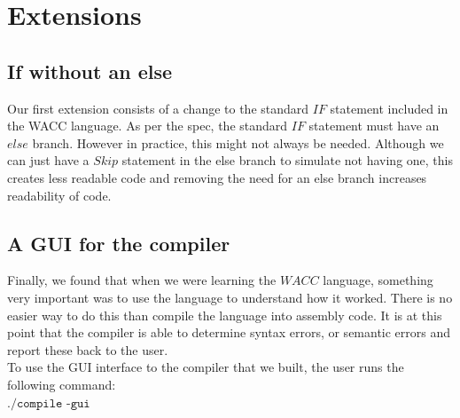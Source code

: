 \documentclass[a4paper, 11pt]{article} %
\begin{document}

\section*{Extensions}


\subsection*{If without an else}
Our first extension consists of a change to the standard $ IF $ statement included in the WACC language. As per the spec, the standard $ IF $ statement must have an $ else $ branch. However in practice, this might not always be needed. Although we can just have a $ Skip $ statement in the else branch to simulate not having one, this creates less readable code and removing the need for an else branch increases readability of code.




\subsection*{A GUI for the compiler}

Finally, we found that when we were learning the $ WACC $ language, something very important was to use the language to understand how it worked. There is no easier way to do this than compile the language into assembly code. It is at this point that the compiler is able to determine syntax errors, or semantic errors and report these back to the user. \\

To use the GUI interface to the compiler that we built, the user runs the following command: \\

\begin{math}
\texttt{./compile -gui}
\end{math} \\
\end{document}
